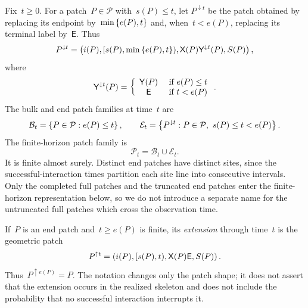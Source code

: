 Fix~$t\geq0$. For a patch~$P\in\mathcal P$ with~$s(P)\leq t$, let
$P^{\downarrow t}$ be the patch obtained by replacing its endpoint
by~$\min\left\{e(P),t\right\}$ and, when~$t<e(P)$, replacing its terminal label
by~$\mathsf E$. Thus
\begin{equation*}
P^{\downarrow t}
=
\left(
 i(P),
 [s(P),\min\left\{e(P),t\right\}),
 \mathsf X(P)\mathsf Y^{\downarrow t}(P),
 S(P)
\right),
\end{equation*}
where
\begin{equation*}
\mathsf Y^{\downarrow t}(P)
=
\left\{\begin{array}{cl} \mathsf Y(P) &\text{ if } e(P)\leq t \\ \mathsf E &\text{ if } t<e(P) \end{array}\right..
\end{equation*}
The bulk and end patch families at time~$t$ are
\begin{equation*}
\mathcal B_t=\left\{P\in\mathcal P:e(P)\leq t\right\},
\qquad
\mathcal E_t=
\left\{P^{\downarrow t}:P\in\mathcal P,\ s(P)\leq t<e(P)\right\}.
\end{equation*}
The finite-horizon patch family is
\begin{equation*}
\mathcal P_t=\mathcal B_t\cup\mathcal E_t.
\end{equation*}
It is finite almost surely. Distinct end patches have distinct sites, since the
successful-interaction times partition each site line into consecutive
intervals. Only the completed full patches and the truncated end patches enter
the finite-horizon representation below, so we do not introduce a separate
name for the untruncated full patches which cross the observation time.

If~$P$ is an end patch and~$t\geq e(P)$ is finite, its \emph{extension} through
time~$t$ is the geometric patch
\begin{equation}
\label{eq:geometric-patch-extension}
P^{\uparrow t}
=
\left(i(P),[s(P),t),\mathsf X(P)\mathsf E,S(P)\right).
\end{equation}
Thus~$P^{\uparrow e(P)}=P$. The notation changes only the patch shape; it does
not assert that the extension occurs in the realized skeleton and does not
include the probability that no successful interaction interrupts it.

